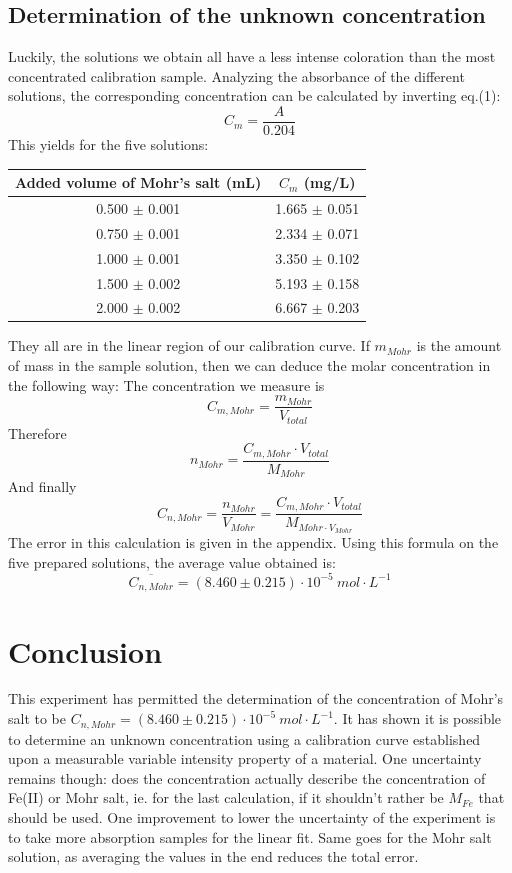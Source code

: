 \documentclass[twocolumn]{article}
\begin{document}
\subsection{Determination of the unknown concentration}
Luckily, the solutions we obtain all have a less intense coloration than the most concentrated calibration sample.
Analyzing the absorbance of the different solutions, the corresponding concentration can be calculated by inverting eq.(1):
\begin{equation}
    C_m = \frac{A}{0.204}
\end{equation}
This yields for the five solutions:
\begin{tabular}{c|c}
    Added volume of Mohr's salt (mL) & $C_m$ (mg/L)\\ \hline
    0.500 $\pm$ 0.001 & 1.665 $\pm$ 0.051 \\
    0.750 $\pm$ 0.001 & 2.334 $\pm$ 0.071 \\
    1.000 $\pm$ 0.001 & 3.350 $\pm$ 0.102 \\
    1.500 $\pm$ 0.002 & 5.193 $\pm$ 0.158 \\
    2.000 $\pm$ 0.002 & 6.667 $\pm$ 0.203
\end{tabular} 
They all are in the linear region of our calibration curve.
If $m_{Mohr}$ is the amount of mass in the sample solution, then we can deduce the molar concentration in the following way: The concentration we measure is \[C_{m,Mohr}=\frac{m_{Mohr}}{V_{total}}\]
Therefore \[ n_{Mohr} = \frac{C_{m,Mohr} \cdot V_{total}}{M_{Mohr}}\]
And finally
\begin{equation}
    C_{n,Mohr} = \frac{n_{Mohr}}{V_{Mohr}} = \frac{C_{m,Mohr} \cdot V_{total}}{M_{Mohr \cdot V_{Mohr}}}
\end{equation}
The error in this calculation is given in the appendix. Using this formula on the five prepared solutions, the average value obtained is: \[ \boxed{\overline{C_{n,Mohr}} = (8.460 \pm 0.215) \cdot 10^{-5} \ mol \cdot L^{-1}} \]
\section{Conclusion}
This experiment has permitted the determination of the concentration of Mohr's salt to be $C_{n,Mohr} = (8.460 \pm 0.215) \cdot 10^{-5} \ mol \cdot L^{-1}$. It has shown it is possible to determine an unknown concentration using a calibration curve established upon a measurable variable intensity property of a material.
One uncertainty remains though: does the concentration actually describe the concentration of Fe(II) or Mohr salt, ie. for the last calculation, if it shouldn't rather be $M_{Fe}$ that should be used.
One improvement to lower the uncertainty of the experiment is to take more absorption samples for the linear fit. Same goes for the Mohr salt solution, as averaging the values in the end reduces the total error.
\onecolumn
\end{document}
